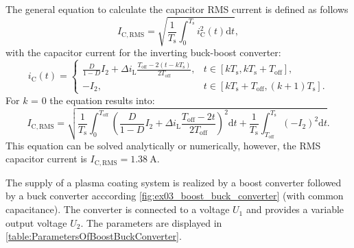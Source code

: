 
\begin{solutionblock}

    The general equation to calculate the capacitor RMS current is defined as follows
    \begin{equation}
        I_{\mathrm{C,RMS}} = \sqrt{\frac{1}{T_{\mathrm{s}}} \int_{0}^{T_{\mathrm{s}}}i_{\mathrm{C}}^2(t)\mathrm{d}t},
    \end{equation}
    with the capacitor current for the inverting buck-boost converter:
    \begin{equation}
        {i_\mathrm{C}(t) = \begin{cases}
            \frac{D}{1-D}I_2 + \Delta i_\mathrm{L} \frac{T_\mathrm{off}-2(t-kT_\mathrm{s})}{2T_\mathrm{off}}, & t\in [k T_\mathrm{s}, k T_\mathrm{s} + T_\mathrm{off}],\\
            -I_2, & t\in [k T_\mathrm{s}+ T_\mathrm{off}, (k+1) T_\mathrm{s}].
        \end{cases}}
    \end{equation}
    For $k$ = 0 the equation results into:
    \begin{equation}
        I_{\mathrm{C,RMS}} = \sqrt{\frac{1}{T_{\mathrm{s}}} \int_{0}^{T_{\mathrm{off}}} \left( \frac{D}{1-D}I_2 + \Delta i_\mathrm{L} \frac{T_\mathrm{off}-2t}{2T_\mathrm{off}}\right)^2 \mathrm{d}t+ \frac{1}{T_{\mathrm{s}}}\int_{T_{\mathrm{off}}}^{T_{\mathrm{s}}} \left(-I_2 \right)^2 \mathrm{d}t}.
    \end{equation}
    This equation can be solved analytically or numerically, however, the RMS capacitor current is $I_{\mathrm{C,RMS}} = \SI{1.38}{\ampere}$.
   
    
\end{solutionblock}




The supply of a plasma coating system is realized by a boost converter followed by a buck converter acccording \autoref{fig:ex03_boost_buck_converter} (with common capacitance).
The converter is connected to a voltage $U_\mathrm{1}$ and provides a variable output voltage $U_\mathrm{2}$. The parameters are displayed in \autoref{table:ParametersOfBoostBuckConverter}.
\vspace{2em}\par

